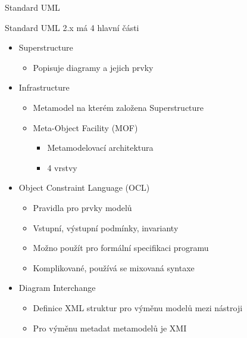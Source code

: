 \begin{frame}{Standard UML}

\onslide<+-> Standard UML 2.x má 4 hlavní části
\begin{itemize}
	\item<+-> Superstructure
	\onslide<+->
	\begin{itemize}
		\item Popisuje diagramy a jejich prvky
	\end{itemize}	
	
	\item<+-> Infrastructure
	\onslide<+->
	\begin{itemize}
		\item Metamodel na kterém založena Superstructure
		\item Meta-Object Facility (MOF)
		\begin{itemize}
			\item Metamodelovací architektura
			\item 4 vrstvy
		\end{itemize}

	\end{itemize}

	\item<+-> Object Constraint Language (OCL)
	\onslide<+->
	\begin{itemize}
		\item Pravidla pro prvky modelů
		\item Vstupní, výstupní podmínky, invarianty
		\item Možno použít pro formální specifikaci programu
		\item Komplikované, používá se mixovaná syntaxe
	\end{itemize}

	\item<+-> Diagram Interchange
	\onslide<+->
	\begin{itemize}
		\item Definice XML struktur pro výměnu modelů mezi nástroji
		\item Pro výměnu metadat metamodelů je XMI
	\end{itemize}

\end{itemize}
	
\end{frame}


